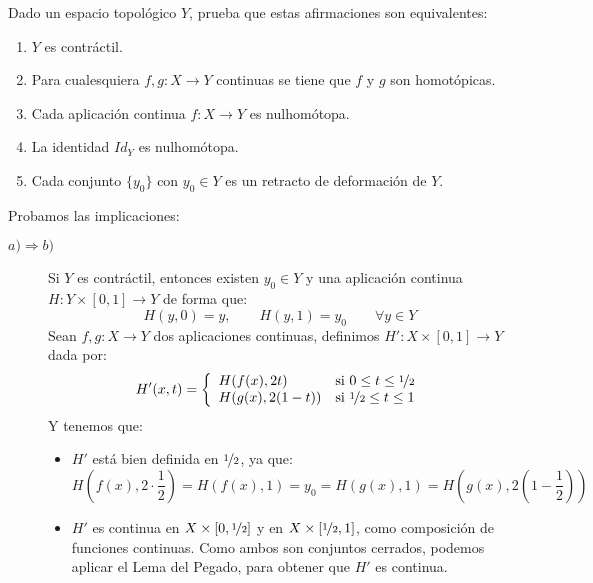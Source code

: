 \begin{ejercicio}
    Dado un espacio topológico $Y$, prueba que estas afirmaciones son equivalentes:
    \begin{enumerate}[label=\alph*)]
        \item $Y$ es contráctil.
        \item Para cualesquiera $f,g:X\to Y$ continuas se tiene que $f$ y $g$ son homotópicas.
        \item Cada aplicación continua $f:X\to Y$ es nulhomótopa.
        \item La identidad $Id_Y$ es nulhomótopa.
        \item Cada conjunto $\{y_0\}$ con $y_0\in Y$ es un retracto de deformación de $Y$.
    \end{enumerate}
    Probamos las implicaciones:
    \begin{description}
        \item [$a)\Longrightarrow b)$] Si $Y$ es contráctil, entonces existen $y_0\in Y$ y una aplicación continua $H:Y\times [0,1]\to Y$ de forma que:
            \begin{equation*}
                H(y,0) = y, \qquad H(y,1) = y_0 \qquad \forall y\in Y
            \end{equation*}
            Sean $f,g:X\to Y$ dos aplicaciones continuas, definimos $H':X\times [0,1]\to Y$ dada por:
            \begin{equation*}
                H'(x,t) = \left\{\begin{array}{ll}
                    H(f(x),2t) & \text{si\ } 0\leq t \leq \nicefrac{1}{2} \\
                    H(g(x),2(1-t)) & \text{si\ } \nicefrac{1}{2}\leq t \leq 1
                \end{array}\right. 
            \end{equation*}
            Y tenemos que:
            \begin{itemize}
                \item $H'$ está bien definida en $\nicefrac{1}{2}$, ya que:
                    \begin{equation*}
                        H\left(f(x), 2\cdot \frac{1}{2}\right) = H(f(x),1) = y_0 = H(g(x),1) = H\left(g(x), 2\left(1-\frac{1}{2}\right)\right)
                    \end{equation*}
                \item $H'$ es continua en $X\times [0,\nicefrac{1}{2}]$ y en $X\times [\nicefrac{1}{2},1]$, como composición de funciones continuas. Como ambos son conjuntos cerrados, podemos aplicar el Lema del Pegado, para obtener que $H'$ es continua.

\end{itemize}
\end{description}
\end{ejercicio}
